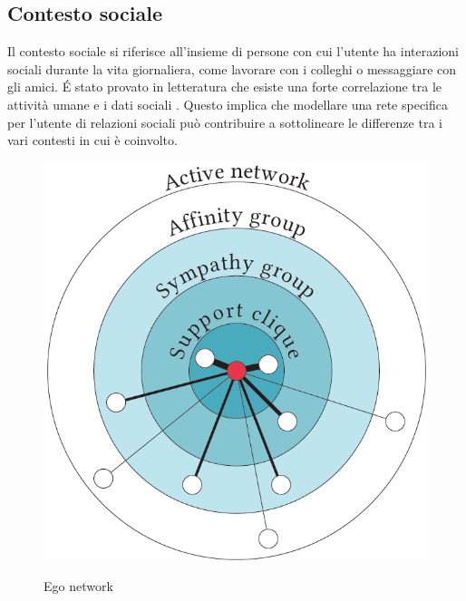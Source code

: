 \documentclass[12pt,italian]{report}
\begin{document}
\subsection{Contesto sociale}
Il contesto sociale si riferisce all'insieme di persone con cui l'utente ha interazioni sociali durante la vita giornaliera, come lavorare con i colleghi o messaggiare con gli amici. \'E stato provato in letteratura che esiste una forte correlazione tra le attività umane e i dati sociali \cite{ego-net}. Questo implica che modellare una rete specifica per l'utente di relazioni sociali può contribuire a sottolineare le differenze tra i vari contesti in cui è coinvolto.

\begin{figure}
  \centering
  \includegraphics[scale=0.50]{immagini/ego-network.png}
  \caption{Ego network}
  \label{fig:ego-network}
  \cite{ego-net}
\end{figure}
\end{document}
